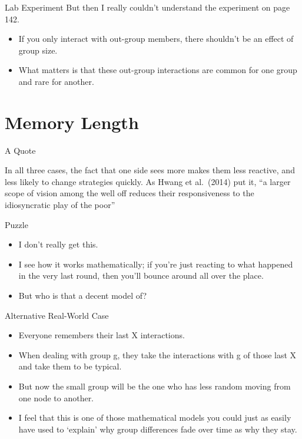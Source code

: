 \documentclass[
  ignorenonframetext,
]{beamer}
\providecommand{\tightlist}{%
  \setlength{\itemsep}{0pt}\setlength{\parskip}{0pt}}
\renewenvironment*{quote}	
	{\list{}{\rightmargin   \leftmargin} \item } 	
	{\endlist }
\begin{document}
\begin{frame}{Lab Experiment}
\protect\hypertarget{lab-experiment}{}
But then I really couldn't understand the experiment on page 142.

\begin{itemize}
\tightlist
\item
  If you only interact with out-group members, there shouldn't be an
  effect of group size.
\item
  What matters is that these out-group interactions are common for one
  group and rare for another.
\end{itemize}
\end{frame}

\hypertarget{memory-length}{%
\section{Memory Length}\label{memory-length}}

\begin{frame}{A Quote}
\protect\hypertarget{a-quote}{}
\begin{quote}
In all three cases, the fact that one side sees more makes them less
reactive, and less likely to change strategies quickly. As Hwang et
al.~(2014) put it, ``a larger scope of vision among the well off reduces
their responsiveness to the idiosyncratic play of the poor''
\end{quote}
\end{frame}

\begin{frame}{Puzzle}
\protect\hypertarget{puzzle}{}
\begin{itemize}
\tightlist
\item
  I don't really get this.
\item
  I see how it works mathematically; if you're just reacting to what
  happened in the very last round, then you'll bounce around all over
  the place.
\item
  But who is that a decent model of?
\end{itemize}
\end{frame}

\begin{frame}{Alternative Real-World Case}
\protect\hypertarget{alternative-real-world-case}{}
\begin{itemize}
\tightlist
\item
  Everyone remembers their last X interactions.
\item
  When dealing with group g, they take the interactions with g of those
  last X and take them to be typical. \pause
\item
  But now the small group will be the one who has less random moving
  from one node to another.
\item
  I feel that this is one of those mathematical models you could just as
  easily have used to `explain' why group differences fade over time as
  why they stay.
\end{itemize}
\end{frame}
\end{document}
